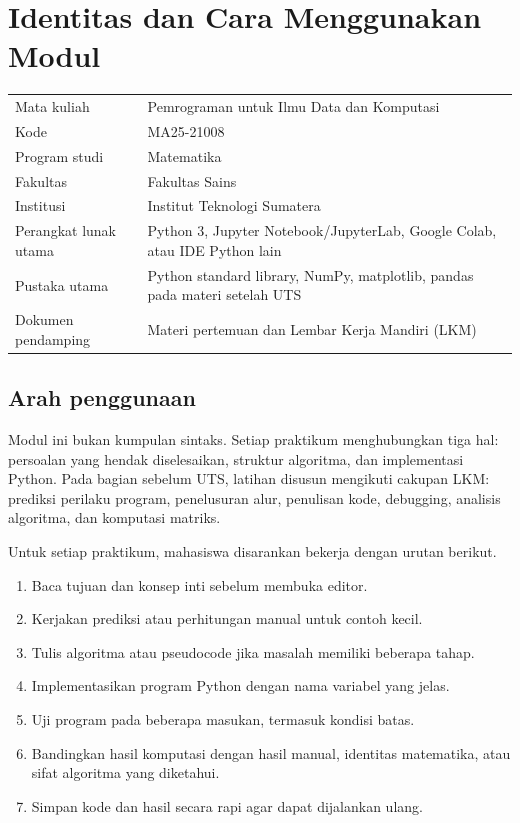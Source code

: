 \documentclass[11pt,a4paper]{report}
\begin{document}
\tableofcontents
\clearpage

\chapter*{Identitas dan Cara Menggunakan Modul}

\begin{tabularx}{\textwidth}{@{}p{}X@{}}
\toprule
Mata kuliah & Pemrograman untuk Ilmu Data dan Komputasi \\
Kode & MA25-21008 \\
Program studi & Matematika \\
Fakultas & Fakultas Sains \\
Institusi & Institut Teknologi Sumatera \\
Perangkat lunak utama & Python 3, Jupyter Notebook/JupyterLab, Google Colab, atau IDE Python lain \\
Pustaka utama & Python standard library, NumPy, matplotlib, pandas pada materi setelah UTS \\
Dokumen pendamping & Materi pertemuan dan Lembar Kerja Mandiri (LKM) \\
\bottomrule
\end{tabularx}

\section*{Arah penggunaan}
Modul ini bukan kumpulan sintaks. Setiap praktikum menghubungkan tiga hal: persoalan yang hendak diselesaikan, struktur algoritma, dan implementasi Python. Pada bagian sebelum UTS, latihan disusun mengikuti cakupan LKM: prediksi perilaku program, penelusuran alur, penulisan kode, debugging, analisis algoritma, dan komputasi matriks.

Untuk setiap praktikum, mahasiswa disarankan bekerja dengan urutan berikut.
\begin{enumerate}
  \item Baca tujuan dan konsep inti sebelum membuka editor.
  \item Kerjakan prediksi atau perhitungan manual untuk contoh kecil.
  \item Tulis algoritma atau pseudocode jika masalah memiliki beberapa tahap.
  \item Implementasikan program Python dengan nama variabel yang jelas.
  \item Uji program pada beberapa masukan, termasuk kondisi batas.
  \item Bandingkan hasil komputasi dengan hasil manual, identitas matematika, atau sifat algoritma yang diketahui.
  \item Simpan kode dan hasil secara rapi agar dapat dijalankan ulang.
\end{enumerate}
\end{document}
